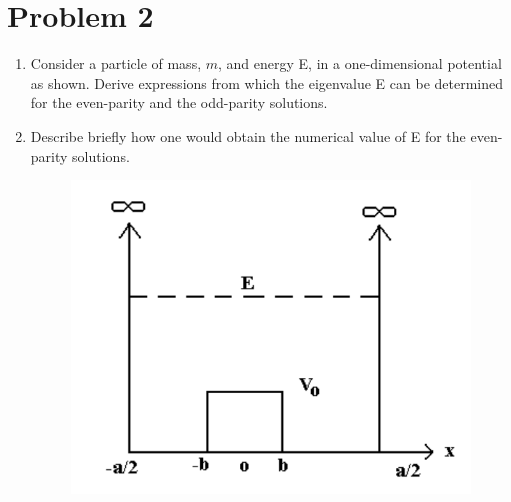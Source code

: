 \documentclass{article}
\begin{document}
\section*{Problem 2} 
\begin{enumerate}[label=\alph*)]
	\item %
	Consider a particle of mass, $\textit{m}$, and energy E, in a one-dimensional potential as shown. Derive expressions from which the eigenvalue E can be determined for the even-parity and the odd-parity solutions.
	\item %
	Describe briefly how one would obtain the numerical value of E for the even-parity solutions.
	\begin{figure}[h]
	\includegraphics[scale=0.25]{P2}
	\centering
	\end{figure}
\end{enumerate}
\end{document}
